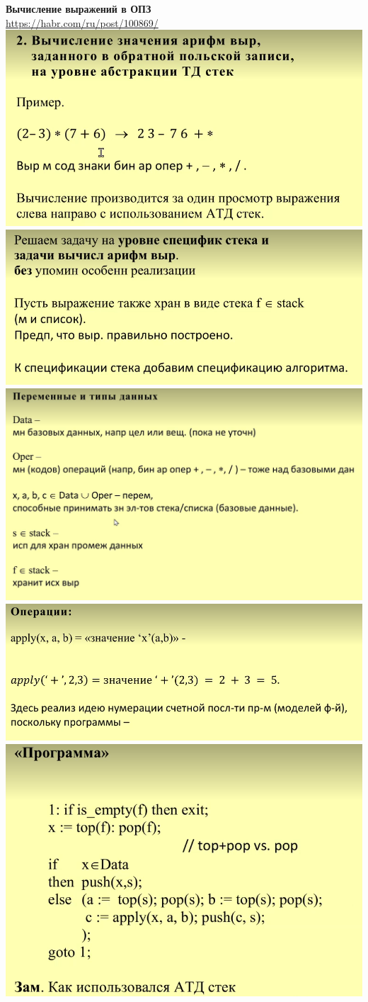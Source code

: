   \textbf{Вычисление выражений в ОПЗ}\\
  \url{https://habr.com/ru/post/100869/}\\
  \includegraphics[width=0.7\linewidth]{pictures/5_7.PNG}\\
  \includegraphics[width=0.7\linewidth]{pictures/5_8.PNG}\\
  \includegraphics[width=0.7\linewidth]{pictures/5_9.PNG}\\
  \includegraphics[width=0.7\linewidth]{pictures/5_10.PNG}\\
  \includegraphics[width=0.7\linewidth]{pictures/5_11.PNG}\\
